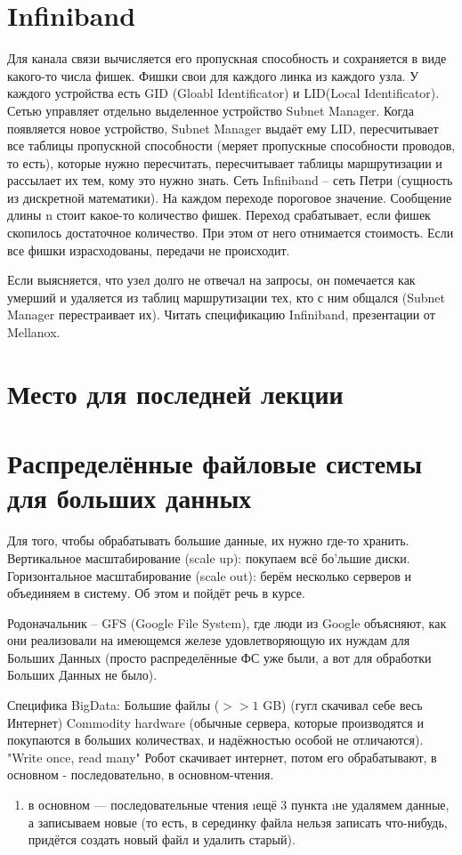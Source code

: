   \section{Infiniband}
  Для канала связи вычисляется его пропускная способность и сохраняется в виде какого-то числа фишек. Фишки свои для каждого линка из каждого узла.
  У каждого устройства есть GID (Gloabl Identificator) и LID(Local Identificator). Сетью управляет отдельно выделенное устройство Subnet Manager. Когда появляется новое устройство, Subnet Manager выдаёт ему LID, пересчитывает все таблицы пропускной способности (меряет пропускные способности проводов, то есть), которые нужно пересчитать, пересчитывает таблицы маршрутизации и рассылает их тем, кому это нужно знать. 
  Сеть Infiniband -- сеть Петри (сущность из дискретной математики). На каждом переходе пороговое значение. Сообщение длины n стоит какое-то количество фишек. Переход срабатывает, если фишек скопилось достаточное количество. При этом от него отнимается стоимость. Если все фишки израсходованы, передачи не происходит.
  
  Если выясняется, что узел долго не отвечал на запросы, он помечается как умерший и удаляется из таблиц маршрутизации тех, кто с ним общался (Subnet Manager перестраивает их). 
  Читать спецификацию Infiniband, презентации от Mellanox.
  
 \section{Место для последней лекции}
 
 
 \section{Распределённые файловые системы для больших данных}
 Для того, чтобы обрабатывать большие данные, их нужно где-то хранить. Вертикальное масштабирование (scale up): покупаем всё бо'льшие диски. Горизонтальное масштабирование (scale out): берём несколько серверов и объединяем в систему. Об этом и пойдёт речь в курсе.
 
 Родоначальник -- GFS (Google File System), где люди из Google объясняют, как они реализовали на имеющемся железе удовлетворяющую их нуждам для Больших Данных (просто распределённые ФС уже были, а вот для обработки Больших Данных не было).
 
 Специфика BigData:
 Большие файлы ($>>1$ GB) (гугл скачивал себе весь Интернет)
 Commodity hardware (обычные сервера, которые производятся и покупаются в больших количествах, и надёжностью особой не отличаются).
 "Write once, read many"
  Робот скачивает интернет, потом его обрабатывают, в основном - последовательно, в основном-чтения.
  \begin{enumerate}
  	\item в основном --- последовательные чтения
  	\i ещё 3 пункта
  	\i не удалямем данные, а записываем новые (то есть, в серединку файла нельзя записать что-нибудь, придётся создать новый файл и удалить старый).
  \end{enumerate}

